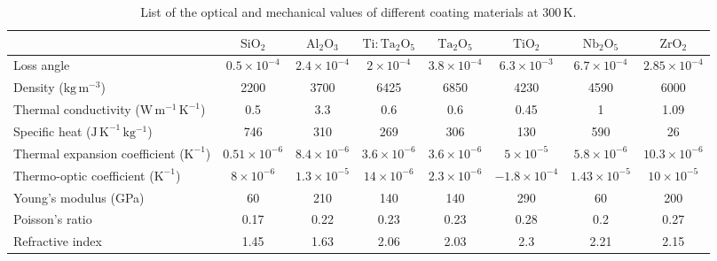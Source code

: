 \begin{table}
\begin{center}
\begin{tabular}{|l|c|c|c|c|c|c|c|}
\hline
& $\mathrm{SiO_2}$ & $\mathrm{Al_2O_3}$ & $\mathrm{Ti:Ta_2O_5}$ & $\mathrm{Ta_2O_5}$ & $\mathrm{TiO_2}$ & $\mathrm{Nb_2O_5}$ & $\mathrm{ZrO_2}$\\
\hline
Loss angle & $0.5\times10^{-4}$ & $2.4\times10^{-4}$ & $2\times10^{-4}$ & $3.8\times10^{-4}$ & $6.3\times10^{-3}$ & $6.7\times10^{-4}$ & $2.85\times10^{-4}$\\
Density ($\mathrm{kg\,m^{-3}}$) & 2200 & 3700 & 6425 & 6850 & 4230 & 4590 & 6000 \\
Thermal conductivity ($\mathrm{W\,m^{-1}\,K^{-1}}$) & 0.5 & 3.3 & 0.6 & 0.6 & 0.45 & 1 & 1.09 \\ 
Specific heat ($\mathrm{J\,K^{-1}\, kg^{-1}}$) & 746 & 310 & 269 & 306 & 130 & 590 & 26 \\
Thermal expansion coefficient ($\mathrm{K^{-1}}$) & $0.51\times10^{-6}$ & $8.4\times10^{-6}$ & $3.6\times10^{-6}$ & $3.6\times10^{-6}$ & $5\times10^{-5}$ & $5.8\times10^{-6}$ & $10.3\times10^{-6}$ \\
Thermo-optic coefficient ($\mathrm{K^{-1}}$) & $8\times10^{-6}$ & $1.3\times10^{-5}$ & $14\times10^{-6}$ & $2.3\times10^{-6}$ & $-1.8\times10^{-4}$ & $1.43\times10^{-5}$ & $10\times10^{-5}$\\
Young's modulus (GPa) & 60 & 210 & 140 & 140 & 290 & 60 & 200 \\
Poisson's ratio & 0.17 & 0.22 & 0.23 & 0.23 & 0.28 & 0.2 & 0.27 \\
Refractive index & 1.45 & 1.63 & 2.06 & 2.03 & 2.3 & 2.21 & 2.15 \\
\hline
\end{tabular}
\end{center}
\caption{List of the optical and mechanical values of different coating materials at 300\,K.}
\label{tab:Coat_param}
\end{table}


